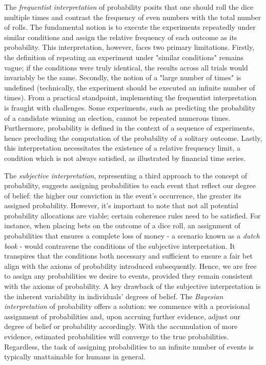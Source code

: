 The \emph{frequentist interpretation} of probability posits that one should roll the dice multiple times and contrast the frequency of even numbers with the total number of rolls. The fundamental notion is to execute the experiments repeatedly under similar conditions and assign the relative frequency of each outcome as its probability. This interpretation, however, faces two primary limitations. Firstly, the definition of repeating an experiment under "similar conditions" remains vague; if the conditions were truly identical, the results across all trials would invariably be the same. Secondly, the notion of a "large number of times" is undefined (technically, the experiment should be executed an infinite number of times). From a practical standpoint, implementing the frequentist interpretation is fraught with challenges. Some experiments, such as predicting the probability of a candidate winning an election, cannot be repeated numerous times. Furthermore, probability is defined in the context of a sequence of experiments, hence precluding the computation of the probability of a solitary outcome. Lastly, this interpretation necessitates the existence of a relative frequency limit, a condition which is not always satisfied, as illustrated by financial time series.

The \emph{subjective interpretation}, representing a third approach to the concept of probability, suggests assigning probabilities to each event that reflect our degree of belief: the higher our conviction in the event's occurrence, the greater its assigned probability. However, it's important to note that not all potential probability allocations are viable; certain coherence rules need to be satisfied. For instance, when placing bets on the outcome of a dice roll, an assignment of probabilities that ensures a complete loss of money - a scenario known as a \emph{dutch book} - would contravene the conditions of the subjective interpretation. It transpires that the conditions both necessary and sufficient to ensure a fair bet align with the axioms of probability introduced subsequently. Hence, we are free to assign any probabilities we desire to events, provided they remain consistent with the axioms of probability. A key drawback of the subjective interpretation is the inherent variability in individuals' degrees of belief. The \emph{Bayesian interpretation} of probability offers a solution: we commence with a provisional assignment of probabilities and, upon accruing further evidence, adjust our degree of belief or probability accordingly. With the accumulation of more evidence, estimated probabilities will converge to the true probabilities. Regardless, the task of assigning probabilities to an infinite number of events is typically unattainable for humans in general.


